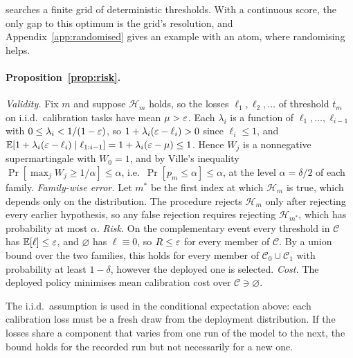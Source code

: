 \climb{} searches a finite grid of deterministic thresholds. With a continuous score, the only gap
to this optimum is the grid's resolution, and Appendix~\ref{app:randomised} gives an example with an atom,
where randomising helps.

\paragraph{Proposition~\ref{prop:risk}.} \emph{Validity.} Fix $m$ and suppose $\mathcal{H}_m$ holds,
so the losses $\ell_1, \ell_2, \dots$ of threshold $t_m$ on i.i.d.\ calibration tasks have mean
$\mu > \varepsilon$. Each $\lambda_i$ is a function of $\ell_1, \dots, \ell_{i-1}$ with
$0 \le \lambda_i < 1/(1-\varepsilon)$, so $1 + \lambda_i(\varepsilon - \ell_i) > 0$ since $\ell_i \le 1$, and
$\mathbb{E}[1 + \lambda_i(\varepsilon - \ell_i) \mid \ell_{1:i-1}] = 1 + \lambda_i(\varepsilon - \mu) \le 1$. Hence $W_j$ is a nonnegative supermartingale with $W_0 = 1$, and by Ville's inequality $\Pr[\max_j W_j \ge 1/\alpha] \le \alpha$, i.e.\ $\Pr[p_m \le \alpha] \le \alpha$, at the level $\alpha = \delta/2$ of each family.
\emph{Family-wise error.} Let $m^*$ be the first index at which $\mathcal{H}_m$ is true, which
depends only on the distribution. The procedure rejects $\mathcal{H}_m$ only after rejecting every
earlier hypothesis, so any false rejection requires rejecting $\mathcal{H}_{m^*}$, which has probability at most $\alpha$. \emph{Risk.} On the complementary event every threshold in
$\mathcal{C}$ has $\mathbb{E}[\ell] \le \varepsilon$, and $\varnothing$ has $\ell \equiv 0$, so $R \le \varepsilon$ for every member of $\mathcal{C}$. By a union bound over the two families, this holds for every member of $\mathcal{C}_0 \cup \mathcal{C}_1$ with probability at least $1 - \delta$, however the deployed one is selected. \emph{Cost.} The deployed
policy minimises mean calibration cost over $\mathcal{C} \ni \varnothing$.

The i.i.d.\ assumption is used in the conditional expectation above: each calibration loss must be
a fresh draw from the deployment distribution. If the losses share a component that varies from
one run of the model to the next, the bound holds for the recorded run but not necessarily for a
new one.

